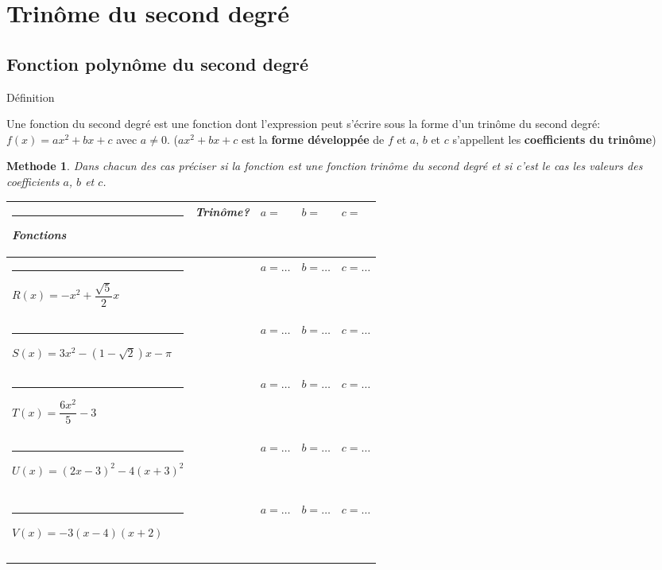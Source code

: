 \documentclass[11pt,a4paper]{article}
\theoremstyle{break}
\newtheorem{Meth}{Methode}
\begin{document}
	\begin{center}
		\shadowbox{\begin{large}
				\textcolor{black}{ FONCTIONS du SECOND et TROISIÈME DEGRÉ}
		\end{large}}
	\end{center}
	\vspace{0.5 cm}
	\tableofcontents
	
	\section{Trinôme du second degré}
	
	\subsection{Fonction polynôme du second degré}
	\begin{bclogo}[couleur = yellow!30, arrondi = 0.1,logo=\bcbook]{Définition }
		
		Une fonction du second degré est une fonction dont l'expression 
		peut s'écrire sous la forme d'un trin\^ome du second degré: 
		$f(x)=ax^2+bx+c$ avec $a\neq0$. ($ax^2+bx+c$ est la \textbf{forme développée} de $f$ et $a$, $b$ et $c$ s'appellent les \textbf{coefficients du trinôme})
	\end{bclogo}
	
	\begin{Meth}
		Dans chacun des cas préciser si la fonction est une fonction trinôme du second degré et si c'est le cas les valeurs des coefficients $a$, $b$ et $c$.\\
		\begin{tabular}{|p{7cm}|p{2cm}|p{2cm}|p{2.8cm}|p{}|}\hline
			
			\rule[-0.4cm]{0.cm}{1cm}
			Fonctions &Trinôme?& $a=$  & $b=$ & $c=$  \\[0.2cm]\hline
			
			\rule[-0.4cm]{0.cm}{1cm}
			$R(x)=-x^2+\dfrac{\sqrt{5}}2 x$ 
			&& $a=\dots$ & $b=\dots$ & $c=\dots$ 
			\\\hline
			\rule[-0.4cm]{0.cm}{1cm}
			$S(x)=3x^2-\left( 1-\sqrt{2}\right)  x-\pi$ 
			&& $a=\dots$ & $b=\dots$ & $c=\dots$ 
			\\\hline
			\rule[-0.4cm]{0.cm}{1cm}
			$T(x)=\dfrac{6x^2}5 -3$ 
			&& $a=\dots$ & $b=\dots$ & $c=\dots$ 
			\\\hline
			\rule[-0.4cm]{0.cm}{1cm}
			$U(x)=(2x-3)^2-4(x+3)^2$ 
			&& $a=\dots$ & $b=\dots$ & $c=\dots$ 
			\\
			&&&&\\
			&&&&
			\\\hline
				\rule[-0.4cm]{0.cm}{1cm}
			$V(x)=-3(x-4)(x+2)$ 
			&& $a=\dots$ & $b=\dots$ & $c=\dots$ 
			\\
			&&&&\\
			&&&&
			\\\hline
			
		\end{tabular}
	\end{Meth}
	
\end{document}
